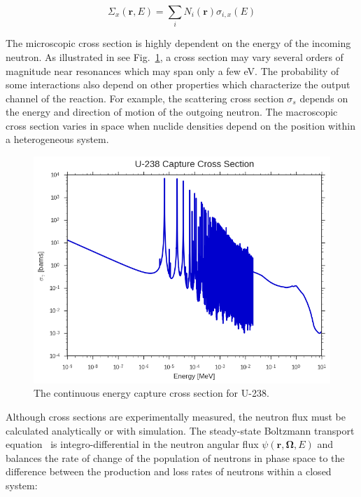 \begin{dmath}
\label{eqn:chap2-macro-xs-sum}
\Sigma_{x}(\mathbf{r},E) = \sum_{i}N_{i}(\mathbf{r})\sigma_{i,x}(E)
\end{dmath}

The microscopic cross section is highly dependent on the energy of the incoming neutron. As illustrated in see Fig.~\ref{fig:chap2-u238-xs}, a cross section may vary several orders of magnitude near resonances which may span only a few eV. The probability of some interactions also depend on other properties which characterize the output channel of the reaction. For example, the scattering cross section $\sigma_{s}$ depends on the energy and direction of motion of the outgoing neutron. The macroscopic cross section varies in space when nuclide densities depend on the position within a heterogeneous system.


\begin{figure}[H]
  \centering
  \includegraphics[width=0.8\linewidth]{figures/mgxs/u238-capture-xs}
\caption[U-238 capture cross section]{The continuous energy capture cross section for U-238.}
\label{fig:chap2-u238-xs}
\end{figure}
 
Although cross sections are experimentally measured, the neutron flux must be calculated analytically or with simulation. The steady-state Boltzmann transport equation~\cite{bell1970nuclear} is integro-differential in the neutron angular flux $\psi(\mathbf{r},\mathbf{\Omega},E)$ and balances the rate of change of the population of neutrons in phase space to the difference between the production and loss rates of neutrons within a closed system:


